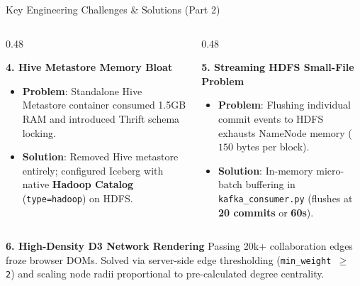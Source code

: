 \documentclass[aspectratio=169, 10pt]{beamer}
\begin{document}
\begin{frame}{Key Engineering Challenges \& Solutions (Part 2)}
  \begin{columns}[T]
    \begin{column}{0.48\textwidth}
      \begin{block}{\textbf{4. Hive Metastore Memory Bloat}}
        \begin{itemize}
          \item \textbf{Problem}: Standalone Hive Metastore container consumed 1.5GB RAM and introduced Thrift schema locking.
          \item \textbf{Solution}: Removed Hive metastore entirely; configured Iceberg with native \textbf{Hadoop Catalog} (\texttt{type=hadoop}) on HDFS.
        \end{itemize}
      \end{block}
    \end{column}

    \begin{column}{0.48\textwidth}
      \begin{block}{\textbf{5. Streaming HDFS Small-File Problem}}
        \begin{itemize}
          \item \textbf{Problem}: Flushing individual commit events to HDFS exhausts NameNode memory ($150$ bytes per block).
          \item \textbf{Solution}: In-memory micro-batch buffering in \texttt{kafka\_consumer.py} (flushes at \textbf{20 commits} or \textbf{60s}).
        \end{itemize}
      \end{block}
    \end{column}
  \end{columns}
  \vspace{0.2cm}
  \begin{block}{\textbf{6. High-Density D3 Network Rendering}}
    Passing 20k+ collaboration edges froze browser DOMs. Solved via server-side edge thresholding (\texttt{min\_weight $\ge$ 2}) and scaling node radii proportional to pre-calculated degree centrality.
  \end{block}
\end{frame}
\end{document}
